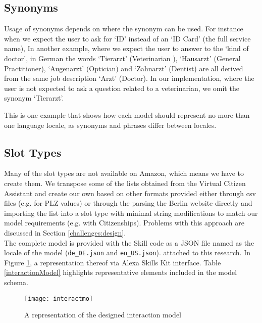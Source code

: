 \subsection*{Synonyms}
Usage of synonyms depends on where the synonym can be used. For instance when we expect the user to ask for `ID' instead of an `ID Card' (the full service name), In another example, where we expect the user to answer to the `kind of doctor', in German the words `Tierarzt' (Veterinarian ), `Hausarzt' (General Practitioner), `Augenarzt' (Optician) and `Zahnarzt' (Dentist) are all derived from the same job description `Arzt' (Doctor). In our implementation, where the user is not expected to ask a question related to a veterinarian, we omit the synonym `Tierarzt'.

This is one example that shows how each model should represent no more than one language locale, as synonyms and phrases differ between locales.


\subsection*{Slot Types}
Many of the slot types are not available on Amazon, which means we have to create them. We transpose some of the lists obtained from the Virtual Citizen Assistant and create our own based on other formats provided either through csv files (e.g. for PLZ values) or through the parsing the Berlin website directly and importing the list into a slot type with minimal string modifications to match our model requirements (e.g. with Citizenships). Problems with this approach are discussed in Section \ref{challenges:design}. \\





The complete model is provided with the Skill code as a JSON file named as the locale of the model (\texttt{de_DE.json} and \texttt{en_US.json}). attached to this research. In Figure \ref{interactionModel:bild}, a representation thereof via Alexa Skills Kit interface. Table \ref{interactionModel} highlights representative elements included in the model schema.

\begin{figure}[h!]
	\centering
	\caption[Interaction Model]{A representation of the designed interaction model}
	\label{interactionModel:bild}
		\texttt{[image: interactmo]}
		
		  
\end{figure}

